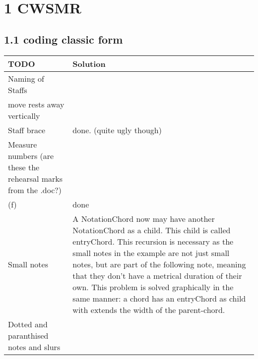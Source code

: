  \section*{1 CWSMR}
 \subsection*{1.1 coding classic form}
 \begin{tabular}{|p{}|p{}|}
 \hline
 \textbf{TODO} &
 \textbf{Solution} 
\\      \hline
 Naming of Staffs &
  
\\ 	\hline
 move rests away vertically &
  
\\ 	\hline
 Staff brace &
  done. (quite ugly though) 
\\ 	\hline
 Measure numbers (are these the rehearsal marks from the .doc?) &
  
\\ 	\hline
 (f) &
  done 
\\ 	\hline
 Small notes &
  A NotationChord now may have another NotationChord as a child. This child is called entryChord. This recursion is necessary as the small notes in the example are not just small notes, but are part of the following note, meaning that they don't have a metrical duration of their own. This problem is solved graphically in the same manner: a chord has an entryChord as child with extends the width of the parent-chord. 
\\ 	\hline
 Dotted and paranthised notes and slurs &
  

\end{tabular}
